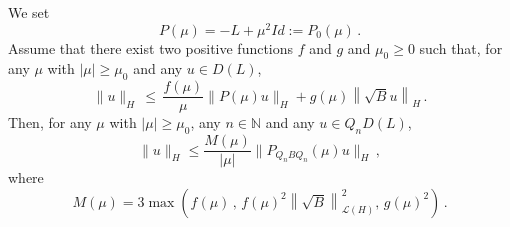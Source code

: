 \documentclass[10pt]{amsart}
\theoremstyle{definition}\newtheorem{defi}[theo]{Definition}\newtheorem{rema}[theo]{Remark}\newtheorem{exam}[theo]{Example}\newtheorem{exem}[theo]{Example}\newtheorem{nota}[theo]{Notation}
\newcommand{\NN}{\mathbb{N}}
\newcommand{\Lc}{\mathcal{L}}
\begin{document}
\begin{prop}\label{prop-1-appendix-high-frequencies}
We set
\[
P(\mu)=-L+\mu^2 Id:=P_0(\mu)\,.
\]
Assume that there exist two positive functions $f$ and $g$ and $\mu_0\geq 0$ such that, for any $\mu$ with $|\mu|\geq \mu_0$ and any $u\in D(L)$,
\begin{equation}\label{hyp-appendix-high-frequencies}
\|u\|_H\,\leq\,\frac{f(\mu)}\mu \|P(\mu)u\|_H + g(\mu) \left\|\sqrt{B} u\right\|_H\,.
\end{equation}
Then, for any $\mu$ with $|\mu|\geq \mu_0$, any $n\in\NN$ and any $u\in Q_nD(L)$,
\begin{equation}\label{result-prop-1-1-high-frequencies}
\|u\|_H\leq \frac{M(\mu)}{|\mu|} \|P_{Q_n B Q_n}(\mu)u\|_H\,,
\end{equation}
where
\begin{equation}\label{result-prop-1-3-appendix-high-frequencies}
M(\mu)= 3 \max \left({f(\mu)}\,,\,f(\mu)^2\left\|\sqrt{B}\right\|_{\Lc(H)}^2,\,g(\mu)^2\right)\,.
\end{equation}
\end{prop}
\end{document}
